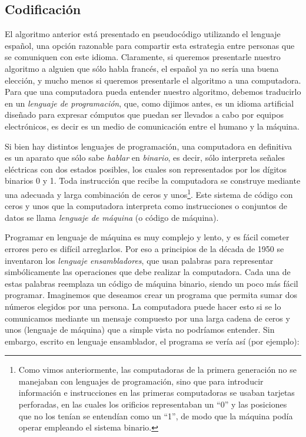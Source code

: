 \documentclass[
]{book}
\begin{document}
\hypertarget{codificaciuxf3n}{%
\subsection{Codificación}\label{codificaciuxf3n}}

El algoritmo anterior está presentado en pseudocódigo utilizando el lenguaje español, una opción razonable para compartir esta estrategia entre personas que se comuniquen con este idioma. Claramente, si queremos presentarle nuestro algoritmo a alguien que sólo habla francés, el español ya no sería una buena elección, y mucho menos si queremos presentarle el algoritmo a una computadora. Para que una computadora pueda entender nuestro algoritmo, debemos traducirlo en un \emph{lenguaje de programación}, que, como dijimos antes, es un idioma artificial diseñado para expresar cómputos que puedan ser llevados a cabo por equipos electrónicos, es decir es un medio de comunicación entre el humano y la máquina.

Si bien hay distintos lenguajes de programación, una computadora en definitiva es un aparato que sólo sabe \emph{hablar} en \emph{binario}, es decir, sólo interpreta señales eléctricas con dos estados posibles, los cuales son representados por los dígitos binarios 0 y 1. Toda instrucción que recibe la computadora se construye mediante una adecuada y larga combinación de ceros y unos\footnote{Como vimos anteriormente, las computadoras de la primera generación no se manejaban con lenguajes de programación, sino que para introducir información e instrucciones en las primeras computadoras se usaban tarjetas perforadas, en las cuales los orificios representaban un ``0'' y las posiciones que no los tenían se entendían como un ``1'', de modo que la máquina podía operar empleando el sistema binario.}. Este sistema de código con ceros y unos que la computadora interpreta como instrucciones o conjuntos de datos se llama \emph{lenguaje de máquina} (o código de máquina).

Programar en lenguaje de máquina es muy complejo y lento, y es fácil cometer errores pero es difícil arreglarlos. Por eso a principios de la década de 1950 se inventaron los \emph{lenguaje ensambladores}, que usan palabras para representar simbólicamente las operaciones que debe realizar la computadora. Cada una de estas palabras reemplaza un código de máquina binario, siendo un poco más fácil programar. Imaginemos que deseamos crear un programa que permita sumar dos números elegidos por una persona. La computadora puede hacer esto si se lo comunicamos mediante un mensaje compuesto por una larga cadena de ceros y unos (lenguaje de máquina) que a simple vista no podríamos entender. Sin embargo, escrito en lenguaje ensamblador, el programa se vería así (por ejemplo):
\end{document}
